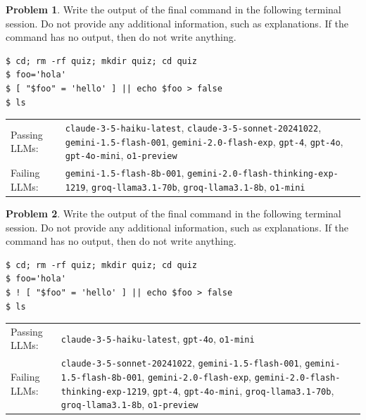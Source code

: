 \documentclass[10pt]{article}
\theoremstyle{definition}
\newtheorem{problem}{Problem}
\begin{document}
\noindent\vspace{0.1in}\begin{minipage}{\textwidth}

\begin{problem}
Write the output of the final command in the following terminal session.
Do not provide any additional information,
such as explanations.
If the command has no output,
then do not write anything.

\end{problem}
\begin{lstlisting}
$ cd; rm -rf quiz; mkdir quiz; cd quiz
$ foo='hola'
$ [ "$foo" = 'hello' ] || echo $foo > false
$ ls
\end{lstlisting}


\noindent
\begin{tabular}{p{1.0in}L{5in}}
Passing LLMs: & {\lstinline$claude-3-5-haiku-latest$}, {\lstinline$claude-3-5-sonnet-20241022$}, {\lstinline$gemini-1.5-flash-001$}, {\lstinline$gemini-2.0-flash-exp$}, {\lstinline$gpt-4$}, {\lstinline$gpt-4o$}, {\lstinline$gpt-4o-mini$}, {\lstinline$o1-preview$} \\
Failing LLMs: & {\lstinline$gemini-1.5-flash-8b-001$}, {\lstinline$gemini-2.0-flash-thinking-exp-1219$}, {\lstinline$groq-llama3.1-70b$}, {\lstinline$groq-llama3.1-8b$}, {\lstinline$o1-mini$} \\
\end{tabular}

\end{minipage}
\noindent\vspace{0.1in}\begin{minipage}{\textwidth}

\begin{problem}
Write the output of the final command in the following terminal session.
Do not provide any additional information,
such as explanations.
If the command has no output,
then do not write anything.

\end{problem}
\begin{lstlisting}
$ cd; rm -rf quiz; mkdir quiz; cd quiz
$ foo='hola'
$ ! [ "$foo" = 'hello' ] || echo $foo > false
$ ls
\end{lstlisting}


\noindent
\begin{tabular}{p{1.0in}L{5in}}
Passing LLMs: & {\lstinline$claude-3-5-haiku-latest$}, {\lstinline$gpt-4o$}, {\lstinline$o1-mini$} \\
Failing LLMs: & {\lstinline$claude-3-5-sonnet-20241022$}, {\lstinline$gemini-1.5-flash-001$}, {\lstinline$gemini-1.5-flash-8b-001$}, {\lstinline$gemini-2.0-flash-exp$}, {\lstinline$gemini-2.0-flash-thinking-exp-1219$}, {\lstinline$gpt-4$}, {\lstinline$gpt-4o-mini$}, {\lstinline$groq-llama3.1-70b$}, {\lstinline$groq-llama3.1-8b$}, {\lstinline$o1-preview$} \\
\end{tabular}

\end{minipage}
\end{document}
